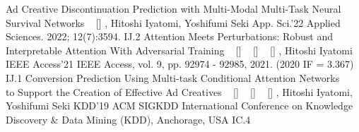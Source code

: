 
\begin{publications}
    \publication
    {Ad Creative Discontinuation Prediction with Multi-Modal Multi-Task Neural Survival Networks}
    {
    ~ [\href{https://www.mdpi.com/2076-3417/12/7/3594}{\small{\linkSymbol}}]
    }
    {\underline{}, Hitoshi Iyatomi, Yoshifumi Seki}
    {App. Sci.'22} {Applied Sciences. 2022; 12(7):3594.} {IJ.2}
    \publication
    {Attention Meets Perturbations: Robust and Interpretable Attention With Adversarial Training}
    {
    ~ [\href{https://ieeexplore.ieee.org/document/9467291}{\small{\linkSymbol}}]
    ~ [\href{https://arxiv.org/abs/2009.12064}{\small{\arxivSymbol}}]
    ~ [\href{https://github.com/shunk031/attention-meets-perturbation}{\small{\githubSymbol}}]
    }
    {\underline{}, Hitoshi Iyatomi}
    {IEEE Access'21} {IEEE Access, vol. 9, pp. 92974 - 92985, 2021. (2020 IF = 3.367)} {IJ.1}
    \publication
    {Conversion Prediction Using Multi-task Conditional Attention Networks \\ to Support the Creation of Effective Ad Creatives}
    {
    ~ [\href{https://dl.acm.org/doi/10.1145/3292500.3330789}{\small{\linkSymbol}}]
    ~ [\href{https://arxiv.org/abs/1905.07289}{\small{\arxivSymbol}}]
    ~ [\href{https://github.com/shunk031/Multi-task-Conditional-Attention-Networks}{\small{\githubSymbol}}]
    }
    {\underline{}, Hitoshi Iyatomi, Yoshifumi Seki}
    {KDD'19} {ACM SIGKDD International Conference on Knowledge Discovery \& Data Mining (KDD), Anchorage, USA} {IC.4}
\end{publications}


